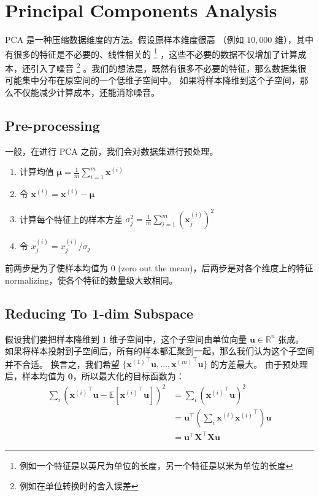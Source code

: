 \chapter{Principal Components Analysis}
	PCA 是一种压缩数据维度的方法。假设原样本维度很高 （例如 $ 10,000 $ 维），其中有很多的特征是不必要的、线性相关的
	\footnote{例如一个特征是以英尺为单位的长度，另一个特征是以米为单位的长度}
	，这些不必要的数据不仅增加了计算成本，还引入了噪音
	\footnote{例如在单位转换时的舍入误差}
	。我们的想法是，既然有很多不必要的特征，那么数据集很可能集中分布在原空间的一个低维子空间中。
	如果将样本降维到这个子空间，那么不仅能减少计算成本，还能消除噪音。
	
	\section{Pre-processing}
		一般，在进行 PCA 之前，我们会对数据集进行预处理。
		\begin{enumerate}
			\item 计算均值 $ \bm{\mu} = \frac{1}{m} \sum_{i=1}^{m} \bm{x}^{(i)} $
			\item 令 $ \bm{x}^{(i)} = \bm{x}^{(i)} - \bm{\mu} $
			\item 计算每个特征上的样本方差 $ \sigma_j^2 = \frac{1}{m} \sum_{i=1}^{m} \left( \bm{x}_j^{(i)} \right)^2 $
			\item 令 $ x_j^{(i)} = x_j^{(i)} / \sigma_j  $
		\end{enumerate}
		前两步是为了使样本均值为 $ 0 $ (zero out the mean)，后两步是对各个维度上的特征 normalizing，使各个特征的数量级大致相同。
	
	\section{Reducing To 1-dim Subspace}
		假设我们要把样本降维到 $ 1 $ 维子空间中，这个子空间由单位向量 $ \bm{u} \in \mathbb{R}^n $ 张成。
		如果将样本投射到子空间后，所有的样本都汇聚到一起，那么我们认为这个子空间并不合适。
		换言之，我们希望 $ \{ {\bm{x}^{(1)}}^\intercal \bm{u}, \ldots, {\bm{x}^{(m)}}^\intercal \bm{u} \} $ 的方差最大。
		由于预处理后，样本均值为 $ \bm{0} $，所以最大化的目标函数为：
		\begin{align*}
			\sum_i \left( {\bm{x}^{(i)}}^\intercal \bm{u} - \mathbb{E} \left[ {\bm{x}^{(i)}}^\intercal \bm{u} \right] \right)^2 &= \sum_i \left( {\bm{x}^{(i)}}^\intercal \bm{u} \right)^2 \\
			&= \bm{u}^\intercal \left(\sum_i \bm{x}^{(i)} {\bm{x}^{(i)}}^\intercal \right) \bm{u} \\
			&= \bm{u}^\intercal \bm{X}^\intercal \bm{Xu}
		\end{align*}
		
